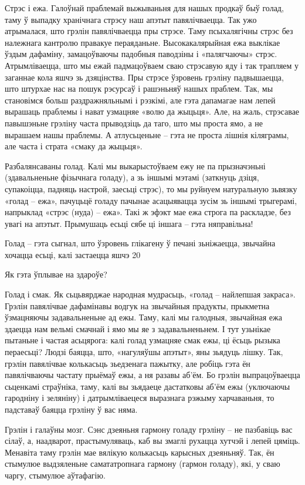 Стрэс і ежа.
Галоўнай праблемай выжываньня для нашых продкаў быў голад, таму ў выпадку хранічнага стрэсу наш апэтыт павялічваецца. Так ужо атрымалася, што грэлін павялічваецца пры стрэсе. Таму псыхалягічны стрэс без належнага кантролю правакуе пераяданьне. Высокакалярыйная ежа выклікае ўздым дафаміну, замацоўваючы падобныя паводзіны і «палягчаючы» стрэс. Атрымліваецца, што мы ежай падмацоўваем сваю стрэсавую яду і так трапляем у заганнае кола яшчэ зь дзяцінства. Пры стрэсе ўзровень грэліну падвышаецца, што штурхае нас на пошук рэсурсаў і рашэньняў нашых праблем. Так, мы становімся больш раздражняльнымі і рэзкімі, але гэта дапамагае нам лепей вырашаць праблемы і нават узмацняе «волю да жыцьця». Але, на жаль, стрэсавае павышэньне грэліну часта прыводзіць да таго, што мы проста ямо, а не вырашаем нашы праблемы. А атлусьценьне – гэта не проста лішнія кіляграмы, але часта і страта «смаку да жыцьця».

Разбалянсаваны голад.
Калі мы выкарыстоўваем ежу не па прызначэньні (здавальненьне фізычнага голаду), а зь іншымі мэтамі (заткнуць дзіця, супакоіцца, падняць настрой, заесьці стрэс), то мы руйнуем натуральную зьвязку «голад – ежа», пачуцьцё голаду пачынае асацыявацца зусім зь іншымі трыгерамі, напрыклад «стрэс (нуда) – ежа». Такі ж эфэкт мае ежа строга па раскладзе, без увагі на апэтыт. Прымушаць есьці сябе ці іншага – гэта няправільна!

Голад – гэта сыгнал, што ўзровень глікагену ў печані зьніжаецца, звычайна хочацца есьці, калі застаецца яшчэ 20%

Як гэта ўплывае на здароўе?

Голад і смак.
Як сьцьвярджае народная мудрасьць, «голад – найлепшая закраса». Грэлін павялічвае дафамінавы водгук на звычайныя прадукты, прыкметна ўзмацняючы задавальненьне ад ежы. Таму, калі мы галодныя, звычайная ежа здаецца нам вельмі смачнай і ямо мы яе з задавальненьнем. І тут узьнікае пытаньне і частая асьцярога: калі голад узмацняе смак ежы, ці ёсьць рызыка пераесьці? Людзі баяцца, што, «нагуляўшы апэтыт», яны зьядуць лішку. Так, грэлін павялічвае колькасьць зьедзенага пажытку, але робіць гэта ён павялічваючы частату прыёмаў ежы, а ня разавы аб'ём. Бо грэлін выпрацоўваецца сьценкамі страўніка, таму, калі вы зьядаеце дастатковы аб'ём ежы (уключаючы гародніну і зеляніну) і датрымліваецеся выразнага рэжыму харчаваньня, то падставаў баяцца грэліну ў вас няма.

Грэлін і галаўны мозг.
Сэнс дзеяньня гармону голаду грэліну – не пазбавіць вас сілаў, а, наадварот, прастымуляваць, каб вы змаглі рухацца хутчэй і лепей цяміць. Менавіта таму грэлін мае вялікую колькасьць карысных дзеяньняў. Так, ён стымулюе выдзяленьне самататропнага гармону (гармон голаду), які, у сваю чаргу, стымулюе аўтафагію.

